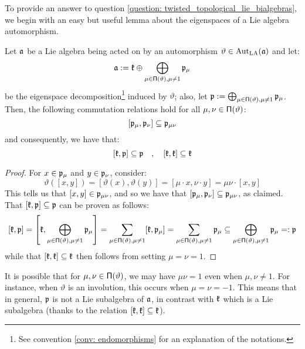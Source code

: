         To provide an answer to question \ref{question: twisted_topological_lie_bialgebras}, we begin with an easy but useful lemma about the eigenspaces of a Lie algebra automorphism.
        \begin{lemma} \label{lemma: symmetric_space_decompositions}
            Let $\mathfrak{a}$ be a Lie algebra being acted on by an automorphism $\vartheta \in \operatorname{Aut}_{\mathrm{LA}}(\mathfrak{a})$ and let:
                $$\mathfrak{a} := \mathfrak{k} \oplus \bigoplus_{ \mu \in \mathsf{\Pi}(\vartheta), \mu \not = 1 } \mathfrak{p}_{\mu}$$
            be the eigenspace decomposition\footnote{See convention \ref{conv: endomorphisms} for an explanation of the notations.} induced by $\vartheta$; also, let $\mathfrak{p} := \bigoplus_{ \mu \in \mathsf{\Pi}(\vartheta), \mu \not = 1 } \mathfrak{p}_{\mu}$. Then, the following commutation relations hold for all $\mu, \nu \in \mathsf{\Pi}(\vartheta)$:
                \begin{equation} \label{equation: symmetric_space_relations}
                    [\mathfrak{p}_{\mu}, \mathfrak{p}_{\nu}] \subseteq \mathfrak{p}_{\mu \nu}
                \end{equation}
            and consequently, we have that:
                $$[\mathfrak{k}, \mathfrak{p}] \subseteq \mathfrak{p} \quad, \quad [\mathfrak{k}, \mathfrak{k}] \subseteq \mathfrak{k}$$
        \end{lemma}
            \begin{proof}
                For $x \in \mathfrak{p}_{\mu}$ and $y \in \mathfrak{p}_{\nu}$, consider:
                    $$\vartheta( [x, y] ) = [ \vartheta(x), \vartheta(y) ] = [\mu \cdot x, \nu \cdot y] = \mu \nu \cdot [x, y]$$
                This tells us that $[x, y] \in \mathfrak{p}_{\mu \nu}$, and so we have that $[\mathfrak{p}_{\mu}, \mathfrak{p}_{\nu}] \subseteq \mathfrak{p}_{\mu \nu}$, as claimed. That $[\mathfrak{k}, \mathfrak{p}] \subseteq \mathfrak{p}$ can be proven as follows:
                    $$[\mathfrak{k}, \mathfrak{p}] = \left[ \mathfrak{k}, \bigoplus_{ \mu \in \mathsf{\Pi}(\vartheta), \mu \not = 1 } \mathfrak{p}_{\mu} \right] = \sum_{ \mu \in \mathsf{\Pi}(\vartheta), \mu \not = 1 } [\mathfrak{k}, \mathfrak{p}_{\mu}] = \sum_{ \mu \in \mathsf{\Pi}(\vartheta), \mu \not = 1 } \mathfrak{p}_{\mu} \subseteq \bigoplus_{ \mu \in \mathsf{\Pi}(\vartheta), \mu \not = 1 } \mathfrak{p}_{\mu} =: \mathfrak{p}$$
                while that $[\mathfrak{k}, \mathfrak{k}] \subseteq \mathfrak{k}$ then follows from setting $\mu = \nu = 1$.
            \end{proof}
        \begin{remark}
            It is possible that for $\mu, \nu \in \mathsf{\Pi}(\vartheta)$, we may have $\mu \nu = 1$ even when $\mu, \nu \not = 1$. For instance, when $\vartheta$ is an involution, this occurs when $\mu = \nu = -1$. This means that in general, $\mathfrak{p}$ is not a Lie subalgebra of $\mathfrak{a}$, in contrast with $\mathfrak{k}$ which is a Lie subalgebra (thanks to the relation $[\mathfrak{k}, \mathfrak{k}] \subseteq \mathfrak{k}$).
        \end{remark}
        

